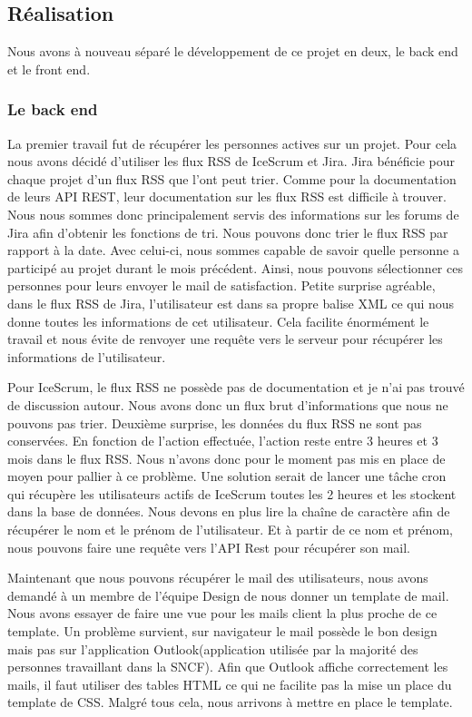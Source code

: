 \documentclass[12pt, twoside, openright]{report}
\begin{document}
\subsection{Réalisation}

Nous avons à nouveau séparé le développement de ce projet en deux, le back end et le front end.

\subsubsection{Le back end}

La premier travail fut de récupérer les personnes actives sur un projet. Pour cela nous avons décidé d'utiliser les flux RSS de IceScrum et Jira. Jira bénéficie pour chaque projet d'un flux RSS que l'ont peut trier. Comme pour la documentation de leurs API REST, leur documentation sur les flux RSS est difficile à trouver. Nous nous sommes donc principalement servis des informations sur les forums de Jira afin d'obtenir les fonctions de tri. Nous pouvons donc trier le flux RSS par rapport à la date. Avec celui-ci, nous sommes capable de savoir quelle personne a participé au projet durant le mois précédent. Ainsi, nous pouvons sélectionner ces personnes pour leurs envoyer le mail de satisfaction. Petite surprise agréable, dans le flux RSS de Jira, l'utilisateur est dans sa propre balise XML ce qui nous donne toutes les informations de cet utilisateur. Cela facilite énormément le travail et nous évite de renvoyer une requête vers le serveur pour récupérer les informations de l'utilisateur.

Pour IceScrum, le flux RSS ne possède pas de documentation et je n'ai pas trouvé de discussion autour. Nous avons donc un flux brut d'informations que nous ne pouvons pas trier. Deuxième surprise, les données du flux RSS ne sont pas conservées. En fonction de l'action effectuée, l'action reste entre 3 heures et 3 mois dans le flux RSS. Nous n'avons donc pour le moment pas mis en place de moyen pour pallier à ce problème. Une solution serait de lancer une tâche cron qui récupère les utilisateurs actifs de IceScrum toutes les 2 heures et les stockent dans la base de données. Nous devons en plus lire la chaîne de caractère afin de récupérer le nom et le prénom de l'utilisateur. Et à partir de ce nom et prénom, nous pouvons faire une requête vers l'API Rest pour récupérer son mail.

Maintenant que nous pouvons récupérer le mail des utilisateurs, nous avons demandé à un membre de l'équipe Design de nous donner un template de mail. Nous avons essayer de faire une vue pour les mails client la plus proche de ce template. Un problème survient, sur navigateur le mail possède le bon design mais pas sur l'application Outlook(application utilisée par la majorité des personnes travaillant dans la SNCF). Afin que Outlook affiche correctement les mails, il faut utiliser des tables HTML ce qui ne facilite pas la mise un place du template de CSS. Malgré tous cela, nous arrivons à mettre en place le template. 
\end{document}
